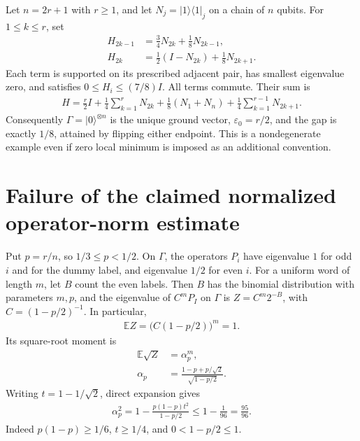 \documentclass{article}
\begin{document}
Let $n=2r+1$ with $r\ge1$, and let $N_j=|1\rangle\langle1|_j$ on a chain
of $n$ qubits. For $1\le k\le r$, set
\begin{align}
    H_{2k-1} & =\frac34N_{2k}+\frac18N_{2k-1},     \\
    H_{2k}   & =\frac12(I-N_{2k})+\frac18N_{2k+1}.
    \label{eq:lvv_sampling_chain}
\end{align}
Each term is supported on its prescribed adjacent pair, has smallest
eigenvalue zero, and satisfies $0\le H_i\le(7/8)I$. All terms commute.
Their sum is
\begin{align}
    H=\frac r2I+\frac14\sum_{k=1}^{r}N_{2k}
    +\frac18(N_1+N_n)+\frac14\sum_{k=1}^{r-1}N_{2k+1}.
    \label{eq:lvv_sampling_hamiltonian}
\end{align}
Consequently $\Gamma=|0\rangle^{\otimes n}$ is the unique ground vector,
$\varepsilon_0=r/2$, and the gap is exactly $1/8$, attained by flipping
either endpoint. This is a nondegenerate example even if zero local
minimum is imposed as an additional convention.

\section{Failure of the claimed normalized operator-norm estimate}

Put $p=r/n$, so $1/3\le p<1/2$. On $\Gamma$, the operators $P_i$ have
eigenvalue $1$ for odd $i$ and for the dummy label, and eigenvalue $1/2$
for even $i$. For a uniform word of length $m$, let $B$ count the even
labels. Then $B$ has the binomial distribution with parameters $m,p$, and
the eigenvalue of $C^mP_I$ on $\Gamma$ is $Z=C^m2^{-B}$, with
$C=(1-p/2)^{-1}$. In particular,
\begin{align}
    \mathbb EZ=\bigl(C(1-p/2)\bigr)^m=1.
    \label{eq:lvv_sampling_word_law}
\end{align}
Its square-root moment is
\begin{align}
    \mathbb E\sqrt Z & =\alpha_p^m,                        \\
    \alpha_p         & =\frac{1-p+p/\sqrt2}{\sqrt{1-p/2}}.
    \label{eq:lvv_sampling_fractional_moment}
\end{align}
Writing $t=1-1/\sqrt2$, direct expansion gives
\begin{align}
    \alpha_p^2
    =1-\frac{p(1-p)t^2}{1-p/2}
    \le 1-\frac1{96}=\frac{95}{96}.
    \label{eq:lvv_sampling_moment_decay}
\end{align}
Indeed $p(1-p)\ge1/6$, $t\ge1/4$, and $0<1-p/2\le1$.
\end{document}
